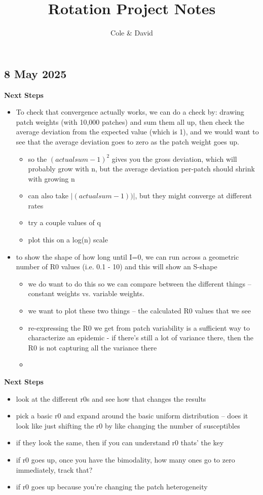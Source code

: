 \documentclass[12pt]{article}%
\begin{document}
\title{Rotation Project Notes}
\author{Cole \& David}
\maketitle

\subsection{8 May 2025}
\textbf{Next Steps}
\begin{itemize}
    \item To check that convergence actually works, we can do a check by: drawing patch weights (with 10,000 patches) and sum them all up, then check the average deviation from the expected value (which is 1), and we would want to see that the average deviation goes to zero as the patch weight goes up. 
    \begin{itemize}
        \item so the $(actual sum - 1)^2$ gives you the gross deviation, which will probably grow with n, but the average deviation per-patch should shrink with growing n 
        \item can also take $|(actual sum - 1))|$, but they might converge at different rates
        \item try a couple values of q 
        \item plot this on a log(n) scale
    \end{itemize}
    \item to show the shape of how long until I=0, we can run across a geometric number of R0 values (i.e. 0.1 - 10) and this will show an S-shape
    \begin{itemize}
        \item we do want to do this so we can compare between the different things -- constant weights vs. variable weights. 
        \item we want to plot these two things -- the calculated R0 values that we see
        \item re-expressing the R0 we get from patch variability is a sufficient way to characterize an epidemic - if there's still a lot of variance there, then the R0 is not capturing all the variance there 
        \item 
    \end{itemize}
\end{itemize}

\textbf{Next Steps}
\begin{itemize}
    \item look at the different r0s and see how that changes the results
    \item pick a basic r0 and expand around the basic uniform distribution -- does it look like just shifting the r0 by like changing the number of susceptibles 
    \item if they look the same, then if you can understand r0 thats' the key 
    \item if r0 goes up, once you have the bimodality, how many ones go to zero immediately, track that? 
    \item if r0 goes up because you're changing the patch heterogeneity
\end{itemize}
\end{document}
